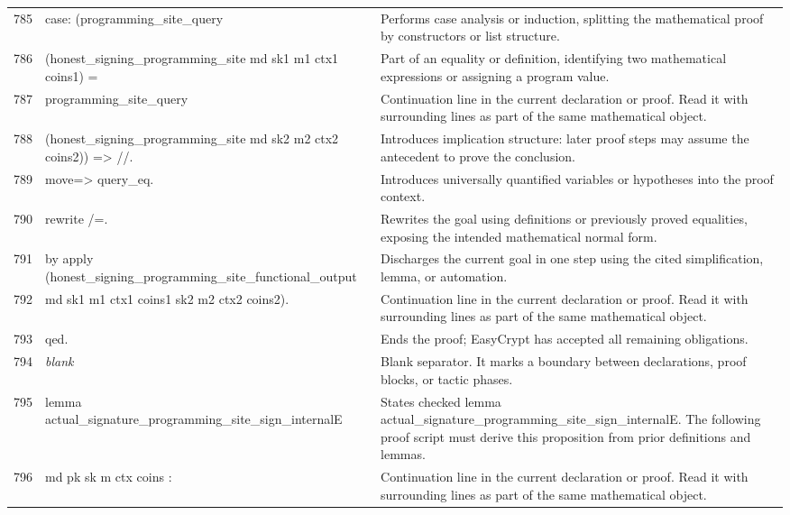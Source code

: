 \documentclass[10pt]{article}
\begin{document}
\begin{longtable}{r L{0.53\textwidth} L{0.37\textwidth}}
785 & {\ttfamily\scriptsize case: (programming\_site\_query} & Performs case analysis or induction, splitting the mathematical proof by constructors or list structure. \\
786 & {\ttfamily\scriptsize         (honest\_signing\_programming\_site md sk1 m1 ctx1 coins1) =} & Part of an equality or definition, identifying two mathematical expressions or assigning a program value. \\
787 & {\ttfamily\scriptsize        programming\_site\_query} & Continuation line in the current declaration or proof.  Read it with surrounding lines as part of the same mathematical object. \\
788 & {\ttfamily\scriptsize         (honest\_signing\_programming\_site md sk2 m2 ctx2 coins2)) => //.} & Introduces implication structure: later proof steps may assume the antecedent to prove the conclusion. \\
789 & {\ttfamily\scriptsize move=> query\_eq.} & Introduces universally quantified variables or hypotheses into the proof context. \\
790 & {\ttfamily\scriptsize rewrite /=.} & Rewrites the goal using definitions or previously proved equalities, exposing the intended mathematical normal form. \\
791 & {\ttfamily\scriptsize by apply (honest\_signing\_programming\_site\_functional\_output} & Discharges the current goal in one step using the cited simplification, lemma, or automation. \\
792 & {\ttfamily\scriptsize             md sk1 m1 ctx1 coins1 sk2 m2 ctx2 coins2).} & Continuation line in the current declaration or proof.  Read it with surrounding lines as part of the same mathematical object. \\
793 & {\ttfamily\scriptsize qed.} & Ends the proof; EasyCrypt has accepted all remaining obligations. \\
794 & {\ttfamily\scriptsize \emph{blank}} & Blank separator.  It marks a boundary between declarations, proof blocks, or tactic phases. \\
795 & {\ttfamily\scriptsize lemma actual\_signature\_programming\_site\_sign\_internalE} & States checked lemma actual\_signature\_programming\_site\_sign\_internalE.  The following proof script must derive this proposition from prior definitions and lemmas. \\
796 & {\ttfamily\scriptsize   md pk sk m ctx coins :} & Continuation line in the current declaration or proof.  Read it with surrounding lines as part of the same mathematical object. \\

\end{longtable}
\end{document}
